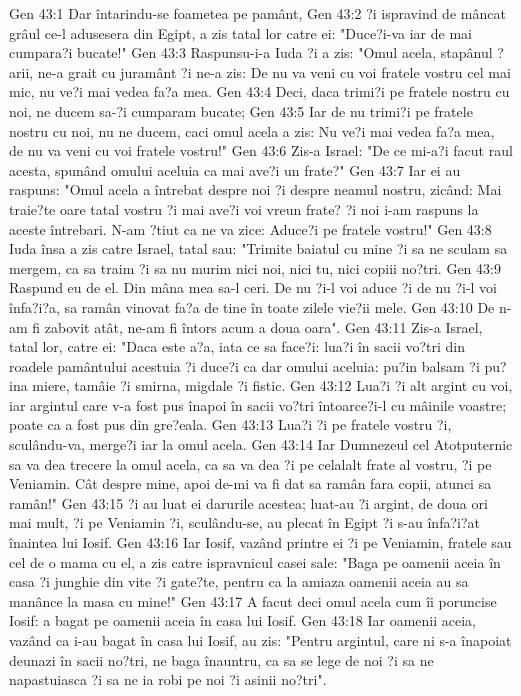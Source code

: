 Gen 43:1  Dar întarindu-se foametea pe pamânt,
Gen 43:2  ?i ispravind de mâncat grâul ce-l adusesera din Egipt, a zis tatal lor catre ei: "Duce?i-va iar de mai cumpara?i bucate!"
Gen 43:3  Raspunsu-i-a Iuda ?i a zis: "Omul acela, stapânul ?arii, ne-a grait cu juramânt ?i ne-a zis: De nu va veni cu voi fratele vostru cel mai mic, nu ve?i mai vedea fa?a mea.
Gen 43:4  Deci, daca trimi?i pe fratele nostru cu noi, ne ducem sa-?i cumparam bucate;
Gen 43:5  Iar de nu trimi?i pe fratele nostru cu noi, nu ne ducem, caci omul acela a zis: Nu ve?i mai vedea fa?a mea, de nu va veni cu voi fratele vostru!"
Gen 43:6  Zis-a Israel: "De ce mi-a?i facut raul acesta, spunând omului aceluia ca mai ave?i un frate?"
Gen 43:7  Iar ei au raspuns: "Omul acela a întrebat despre noi ?i despre neamul nostru, zicând: Mai traie?te oare tatal vostru ?i mai ave?i voi vreun frate? ?i noi i-am raspuns la aceste întrebari. N-am ?tiut ca ne va zice: Aduce?i pe fratele vostru!"
Gen 43:8  Iuda însa a zis catre Israel, tatal sau: "Trimite baiatul cu mine ?i sa ne sculam sa mergem, ca sa traim ?i sa nu murim nici noi, nici tu, nici copiii no?tri.
Gen 43:9  Raspund eu de el. Din mâna mea sa-l ceri. De nu ?i-l voi aduce ?i de nu ?i-l voi înfa?i?a, sa ramân vinovat fa?a de tine în toate zilele vie?ii mele.
Gen 43:10  De n-am fi zabovit atât, ne-am fi întors acum a doua oara".
Gen 43:11  Zis-a Israel, tatal lor, catre ei: "Daca este a?a, iata ce sa face?i: lua?i în sacii vo?tri din roadele pamântului acestuia ?i duce?i ca dar omului aceluia: pu?in balsam ?i pu?ina miere, tamâie ?i smirna, migdale ?i fistic.
Gen 43:12  Lua?i ?i alt argint cu voi, iar argintul care v-a fost pus înapoi în sacii vo?tri întoarce?i-l cu mâinile voastre; poate ca a fost pus din gre?eala.
Gen 43:13  Lua?i ?i pe fratele vostru ?i, sculându-va, merge?i iar la omul acela.
Gen 43:14  Iar Dumnezeul cel Atotputernic sa va dea trecere la omul acela, ca sa va dea ?i pe celalalt frate al vostru, ?i pe Veniamin. Cât despre mine, apoi de-mi va fi dat sa ramân fara copii, atunci sa ramân!"
Gen 43:15  ?i au luat ei darurile acestea; luat-au ?i argint, de doua ori mai mult, ?i pe Veniamin ?i, sculându-se, au plecat în Egipt ?i s-au înfa?i?at înaintea lui Iosif.
Gen 43:16  Iar Iosif, vazând printre ei ?i pe Veniamin, fratele sau cel de o mama cu el, a zis catre ispravnicul casei sale: "Baga pe oamenii aceia în casa ?i junghie din vite ?i gate?te, pentru ca la amiaza oamenii aceia au sa manânce la masa cu mine!"
Gen 43:17  A facut deci omul acela cum îi poruncise Iosif: a bagat pe oamenii aceia în casa lui Iosif.
Gen 43:18  Iar oamenii aceia, vazând ca i-au bagat în casa lui Iosif, au zis: "Pentru argintul, care ni s-a înapoiat deunazi în sacii no?tri, ne baga înauntru, ca sa se lege de noi ?i sa ne napastuiasca ?i sa ne ia robi pe noi ?i asinii no?tri".
